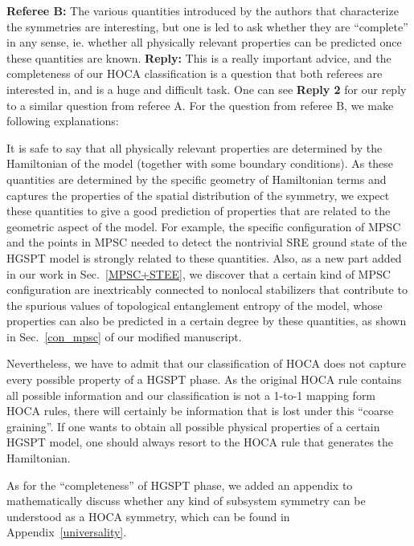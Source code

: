 \documentclass{article}
\begin{document}
\begin{tcolorbox}[title=Reply 8A (point-to-point reply),breakable]
\textbf{Referee B:}  The various quantities introduced by the authors that characterize
the symmetries are interesting, but one is led to ask whether they are
``complete'' in any sense, ie. whether all physically relevant
properties can be predicted once these quantities are known.
\tcblower
\textbf{Reply:} This is a really important advice, and the completeness of our HOCA classification is a question that both referees are interested in, and is a huge and difficult task.  One can see \textbf{Reply 2} for our reply to a similar question from referee A. For the question from referee B, we make following explanations:

It is safe to say that all physically relevant properties are determined by the Hamiltonian of the model (together with some boundary conditions). As these quantities are determined by the specific geometry of Hamiltonian terms and captures the properties of the spatial distribution of the symmetry, we expect these quantities to give a good prediction of properties that are related to the geometric aspect of the model. For example, the specific configuration of MPSC and the points 
 in MPSC needed to detect the nontrivial SRE ground state of the HGSPT model is strongly related to these quantities. Also, as a new part added in our work in Sec.~\ref{MPSC+STEE}, we discover that a certain kind of MPSC configuration are inextricably connected to nonlocal stabilizers that contribute to the spurious values of topological entanglement entropy of the model, whose properties can also be predicted in a certain degree by these quantities, as shown in Sec.~\ref{con_mpsc} of our modified manuscript.
 
\bigskip

 Nevertheless, we have to admit that our classification of HOCA does not capture every possible property of a HGSPT phase. As the original HOCA rule contains all possible information and our classification is not a 1-to-1 mapping form HOCA rules, there will certainly be information that is lost under this ``coarse graining''. If one wants to obtain all possible physical properties of a certain HGSPT model, one should always resort to the HOCA rule that generates the Hamiltonian.
 
\bigskip

 As for the ``completeness'' of HGSPT phase, we added an appendix to mathematically discuss whether any kind of subsystem symmetry can be understood as a HOCA symmetry, which can be found in Appendix~\ref{universality}.
\end{tcolorbox}
\end{document}
